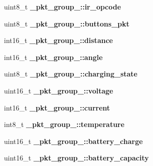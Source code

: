 \begin{DoxyCompactItemize}
\item 
\hypertarget{group__roomba-lib_gab8e021406397624ee4efbb7dff1bf5f7}{}uint8\+\_\+t {\bfseries \+\_\+pkt\+\_\+group\+\_\+::ir\+\_\+opcode}\label{group__roomba-lib_gab8e021406397624ee4efbb7dff1bf5f7}

\item 
\hypertarget{group__roomba-lib_gacee96468c8545379a00c808ba20a1d08}{}uint8\+\_\+t {\bfseries \+\_\+pkt\+\_\+group\+\_\+::buttons\+\_\+pkt}\label{group__roomba-lib_gacee96468c8545379a00c808ba20a1d08}

\item 
\hypertarget{group__roomba-lib_ga9efca08cae31fd9dcca6bb1215d1cf43}{}int16\+\_\+t {\bfseries \+\_\+pkt\+\_\+group\+\_\+::distance}\label{group__roomba-lib_ga9efca08cae31fd9dcca6bb1215d1cf43}

\item 
\hypertarget{group__roomba-lib_ga6bccae8c43255beac2141f5b055ccd9e}{}int16\+\_\+t {\bfseries \+\_\+pkt\+\_\+group\+\_\+::angle}\label{group__roomba-lib_ga6bccae8c43255beac2141f5b055ccd9e}

\item 
\hypertarget{group__roomba-lib_ga42257a8345f22d44adec50aeb3273def}{}uint8\+\_\+t {\bfseries \+\_\+pkt\+\_\+group\+\_\+::charging\+\_\+state}\label{group__roomba-lib_ga42257a8345f22d44adec50aeb3273def}

\item 
\hypertarget{group__roomba-lib_gafbb347cde8b883bb25c9d34e1758b366}{}uint16\+\_\+t {\bfseries \+\_\+pkt\+\_\+group\+\_\+::voltage}\label{group__roomba-lib_gafbb347cde8b883bb25c9d34e1758b366}

\item 
\hypertarget{group__roomba-lib_ga03061bfedba1f8c40ba4ecbca7a2f4ba}{}int16\+\_\+t {\bfseries \+\_\+pkt\+\_\+group\+\_\+::current}\label{group__roomba-lib_ga03061bfedba1f8c40ba4ecbca7a2f4ba}

\item 
\hypertarget{group__roomba-lib_gafa6f545b2d2fb03fa43576dcf21656e1}{}int8\+\_\+t {\bfseries \+\_\+pkt\+\_\+group\+\_\+::temperature}\label{group__roomba-lib_gafa6f545b2d2fb03fa43576dcf21656e1}

\item 
\hypertarget{group__roomba-lib_ga0f14bb2e1aa6194e5762c2d670f30969}{}uint16\+\_\+t {\bfseries \+\_\+pkt\+\_\+group\+\_\+::battery\+\_\+charge}\label{group__roomba-lib_ga0f14bb2e1aa6194e5762c2d670f30969}

\item 
\hypertarget{group__roomba-lib_ga835aa4fbf0f5991bec4809ce527e0c5e}{}uint16\+\_\+t {\bfseries \+\_\+pkt\+\_\+group\+\_\+::battery\+\_\+capacity}\label{group__roomba-lib_ga835aa4fbf0f5991bec4809ce527e0c5e}


\end{DoxyCompactItemize}
